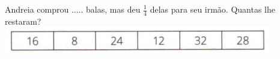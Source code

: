 \documentclass[a4paper,14pt]{article}
\begin{document}
\begin{multicols}{2}
\begin{enumerate}
\begin{enumerate}[a)]
				Andreia comprou ..... balas, mas deu $\frac{1}{4}$ delas para seu irmão. Quantas lhe restaram? \\
				\includegraphics[width=1\linewidth]{6FMA08_imagens/imagem2}
			\end{enumerate}
		\end{enumerate}
		$~$ \\ $~$ \\ $~$ \\ $~$ \\ $~$ \\ $~$ \\ $~$ \\ $~$ \\ $~$ \\ $~$ \\ $~$ \\ $~$ \\ $~$ \\ $~$ \\ $~$ \\ $~$
	\end{multicols}
\end{document}
